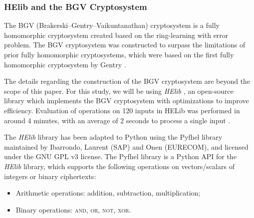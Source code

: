 \subsubsection{HElib and the BGV Cryptosystem}
The BGV (Brakerski--Gentry--Vaikuntanathan) cryptosystem \cite{cryptoeprint:2011:277} is a fully homomorphic cryptosystem created based on the ring-learning with error problem. The BGV cryptosystem was constructed to surpass the limitations of prior fully homomorphic cryptosystems, which were based on the first fully homomorphic cryptosystem by Gentry \cite{gentry_fully_2009}.

The details regarding the construction of the BGV cryptosystem are beyond the scope of this paper. For this study, we will be using \textit{HElib} \cite{garay_algorithms_2014}, an open-source library which implements the BGV cryptosystem with optimizations to improve efficiency. Evaluation of operations on 120 inputs in HELib was performed in around 4 minutes, with an average of 2 seconds to process a single input \cite{hutchison_fully_2010,cryptoeprint:2011:566}.

The \textit{HElib} library has been adapted to Python using the Pyfhel library \cite{pyfhel_2018} maintained by Ibarrondo, Laurent (SAP) and Onen (EURECOM), and licensed under the GNU GPL v3 license. The Pyfhel library is a Python API for the \textit{HElib} library, which supports the following operations on vectors/scalars of integers or binary ciphertexts:
\begin{itemize}
	\item Arithmetic operations: addition, subtraction, multiplication;
	\item Binary operations: \textsc{and}, \textsc{or}, \textsc{not}, \textsc{xor}.
\end{itemize}

